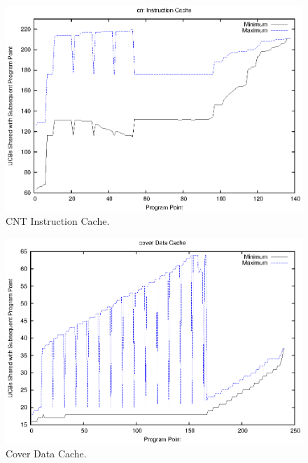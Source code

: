 \begin{figure}[h!]
\begin{center}
\includegraphics[width=\linewidth]{eps/cnt-icache.eps}
\caption{CNT Instruction Cache.}
\label{fig:cnt_instruction_cache}
\end{center}
\end{figure}
%
\vspace{-20pt}
\begin{figure}[h!]
\begin{center}
\includegraphics[width=\linewidth]{eps/cover-dcache.eps}
\caption{Cover Data Cache.}
\label{fig:cover_data_cache}
\end{center}
\end{figure}
%
\vspace{-20pt}
